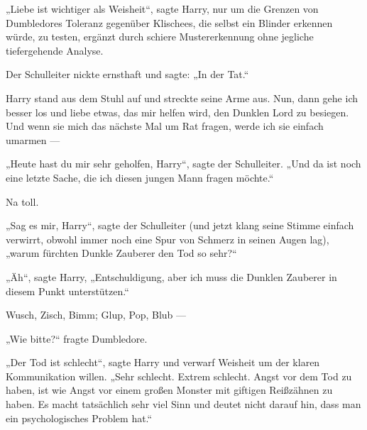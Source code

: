 „Liebe ist wichtiger als Weisheit“, sagte Harry, nur um die Grenzen von Dumbledores Toleranz gegenüber Klischees, die selbst ein Blinder erkennen würde, zu testen, ergänzt durch schiere Mustererkennung ohne jegliche tiefergehende Analyse.

Der Schulleiter nickte ernsthaft und sagte:
„In der Tat.“

Harry stand aus dem Stuhl auf und streckte seine Arme aus. Nun, dann gehe ich besser los und liebe etwas, das mir helfen wird, den Dunklen Lord zu besiegen. Und wenn sie mich das nächste Mal um Rat fragen, werde ich sie einfach umarmen —

„Heute hast du mir sehr geholfen, Harry“, sagte der Schulleiter.
„Und da ist noch eine letzte Sache, die ich diesen jungen Mann fragen möchte.“

Na toll.

„Sag es mir, Harry“, sagte der Schulleiter (und jetzt klang seine Stimme einfach verwirrt, obwohl immer noch eine Spur von Schmerz in seinen Augen lag), „warum fürchten Dunkle Zauberer den Tod so sehr?“

„Äh“, sagte Harry,
„Entschuldigung, aber ich muss die Dunklen Zauberer in diesem Punkt unterstützen.“

\later

Wusch, Zisch, Bimm; Glup, Pop, Blub —

„Wie bitte?“ fragte Dumbledore.

„Der Tod ist schlecht“, sagte Harry und verwarf Weisheit um der klaren Kommunikation willen.
„Sehr schlecht. Extrem schlecht. Angst vor dem Tod zu haben, ist wie Angst vor einem großen Monster mit giftigen Reißzähnen zu haben. Es macht tatsächlich sehr viel Sinn und deutet nicht darauf hin, dass man ein psychologisches Problem hat.“


